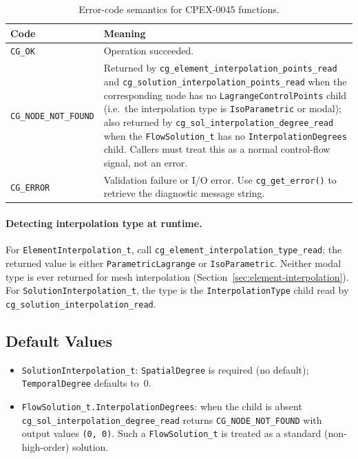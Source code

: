 \documentclass[11pt,letterpaper]{article}
\begin{document}
\begin{table}[htbp]
\centering
\small
{}
\begin{tabularx}{\linewidth}{@{} l >{\raggedright\arraybackslash}X @{}}
\toprule
\textbf{Code} & \textbf{Meaning} \\
\midrule
\texttt{CG\_OK}              & Operation succeeded. \\
\texttt{CG\_NODE\_NOT\_FOUND} & Returned by \texttt{cg\_element\_interpolation\_points\_read} and
  \texttt{cg\_solution\_interpolation\_points\_read} when the corresponding node has no
  \texttt{LagrangeControlPoints} child (i.e.\ the interpolation type is \texttt{IsoParametric}
  or modal); also returned by \texttt{cg\_sol\_interpolation\_degree\_read} when the
  \texttt{FlowSolution\_t} has no \texttt{InterpolationDegrees} child.  Callers must treat this
  as a normal control-flow signal, not an error. \\
\texttt{CG\_ERROR}           & Validation failure or I/O error.  Use \texttt{cg\_get\_error()}
  to retrieve the diagnostic message string. \\
\bottomrule
\end{tabularx}
\caption{Error-code semantics for CPEX-0045 functions.}
\end{table}

\paragraph{Detecting interpolation type at runtime.}
For \texttt{ElementInterpolation\_t}, call \texttt{cg\_element\_interpolation\_type\_read}; the
returned value is either \texttt{ParametricLagrange} or \texttt{IsoParametric}.  Neither modal
type is ever returned for mesh interpolation
(Section~\ref{sec:element-interpolation}).  For \texttt{SolutionInterpolation\_t}, the type is
the \texttt{InterpolationType} child read by \texttt{cg\_solution\_interpolation\_read}.

\subsection{Default Values}

{\sloppy
\begin{itemize}
  \item \texttt{SolutionInterpolation\_t}: \texttt{SpatialDegree} is required (no default);
    \texttt{TemporalDegree} defaults to~0.
  \item \texttt{FlowSolution\_t.InterpolationDegrees}: when the child is absent
    \texttt{cg\_sol\_interpolation\_degree\_read} returns \texttt{CG\_NODE\_NOT\_FOUND} with
    output values \texttt{(0, 0)}.  Such a \texttt{FlowSolution\_t} is treated as a standard
    (non-high-order) solution.
\end{itemize}
\par}
\end{document}
